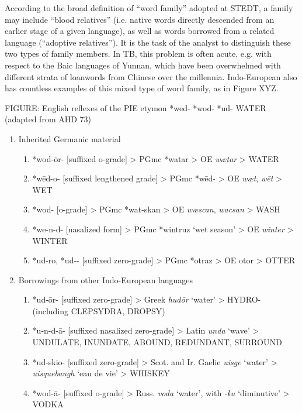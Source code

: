According to the broad definition of “word family” adopted at STEDT, a family may include “blood relatives” (i.e. native words directly descended from an earlier stage of a given language), as well as words borrowed from a related language (“adoptive relatives”). It is the task of the analyst to distinguish these two types of family members. In TB, this problem is often acute, e.g. with respect to the Baic languages of Yunnan, which have been overwhelmed with different strata of loanwords from Chinese over the millennia.  Indo-European also has countless examples of this mixed type of word family, as in Figure XYZ.

	FIGURE: English reflexes of the PIE etymon  *wed-  *wod-  *ud- WATER (adapted from AHD 73)

\begin{enumerate}
\item Inherited Germanic material
\begin{enumerate}
\item  *wod-\=or-	[suffixed o-grade]
	> PGmc *watar > OE {\it w{\ae}tar} > WATER
\item *w\={e}d-o-	[suffixed lengthened grade]
  > PGmc *w\=ed- > OE {\it w{\ae}t}, {\it w\=et} > WET
\item *wod-	[o-grade]
	> PGmc *wat-skan > OE {\it w{\ae}scan}, {\it wacsan} > WASH
\item *we-n-d-	[nasalized form]
	> PGmc *wintruz ‘wet season’ > OE {\it winter} > WINTER
\item *ud-ro, *ud--  [suffixed zero-grade]
	> PGmc *otraz > OE otor > OTTER
\end{enumerate}

\item Borrowings from other Indo-European languages
\begin{enumerate}
\item *ud-\=or-	[suffixed zero-grade]
	> Greek {\it hud\=or} ‘water’ > HYDRO- (including CLEPSYDRA, DROPSY)
\item *u-n-d-\={a}-	[suffixed nasalized zero-grade]
	> Latin {\it unda} ‘wave’ > UNDULATE, INUNDATE, ABOUND, REDUNDANT, SURROUND
\item *ud-skio-	[suffixed zero-grade]
	> Scot. and Ir. Gaelic {\it uisge} ‘water’ > {\it uisquebaugh} ‘eau de vie’ > WHISKEY
\item *wod-\={a}-	[suffixed o-grade]
	> Russ. {\it voda} ‘water’, with {\it -ka} ‘diminutive’ > VODKA
\end{enumerate}
\end{enumerate}




